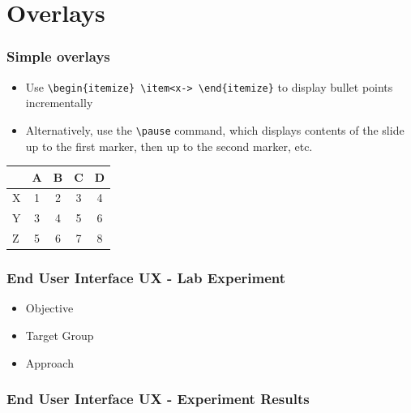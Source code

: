 \documentclass[xcolor=pdftex,t,11pt]{beamer}
\begin{document}
\section{Overlays}


\begin{frame}[fragile]
\frametitle{Simple overlays}
\begin{itemize}
\item<1-> Use \verb!\begin{itemize} \item<x-> \end{itemize}! to display bullet points incrementally
\item<2-> Alternatively, use the \verb!\pause! command, which displays contents of the slide up to the first marker, then up to the second marker, etc.
\end{itemize}
\pause
\begin{table}
\begin{tabular}{lcccc}
        & A & B & C & D \\\hline
  X     & 1 & 2 & 3 & 4 \pause\\
  Y     & 3 & 4 & 5 & 6 \pause\\
  Z     & 5 & 6 & 7 & 8
\end{tabular}
\end{table}
\end{frame}

\begin{frame}[fragile]
\frametitle{End User Interface UX - Lab Experiment}
\begin{itemize}
\item Objective
\item Target Group
\item Approach
\end{itemize}
\end{frame}


\begin{frame}[fragile]
\frametitle{End User Interface UX - Experiment Results}
\centering

\end{frame}
\end{document}
